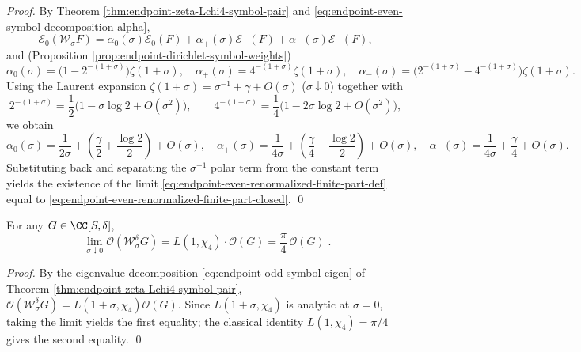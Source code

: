 \begin{proof}
By Theorem \ref{thm:endpoint-zeta-Lchi4-symbol-pair} and \eqref{eq:endpoint-even-symbol-decomposition-alpha},
\[
\mathcal E_0(\mathcal W_\sigma F)
=\alpha_0(\sigma)\mathcal E_0(F)+\alpha_+(\sigma)\mathcal E_+(F)+\alpha_-(\sigma)\mathcal E_-(F),
\]
and (Proposition \ref{prop:endpoint-dirichlet-symbol-weights})
\[
\alpha_0(\sigma)=\bigl(1-2^{-(1+\sigma)}\bigr)\zeta(1+\sigma),\quad
\alpha_+(\sigma)=4^{-(1+\sigma)}\zeta(1+\sigma),\quad
\alpha_-(\sigma)=\bigl(2^{-(1+\sigma)}-4^{-(1+\sigma)}\bigr)\zeta(1+\sigma).
\]
Using the Laurent expansion \(\zeta(1+\sigma)=\sigma^{-1}+\gamma+O(\sigma)\) (\(\sigma\downarrow 0\)) together with
\[
2^{-(1+\sigma)}=\frac12\bigl(1-\sigma\log 2+O(\sigma^2)\bigr),\qquad
4^{-(1+\sigma)}=\frac14\bigl(1-2\sigma\log 2+O(\sigma^2)\bigr),
\]
we obtain
\[
\alpha_0(\sigma)=\frac{1}{2\sigma}+\left(\frac{\gamma}{2}+\frac{\log 2}{2}\right)+O(\sigma),\quad
\alpha_+(\sigma)=\frac{1}{4\sigma}+\left(\frac{\gamma}{4}-\frac{\log 2}{2}\right)+O(\sigma),\quad
\alpha_-(\sigma)=\frac{1}{4\sigma}+\frac{\gamma}{4}+O(\sigma).
\]
Substituting back and separating the \(\sigma^{-1}\) polar term from the constant term yields the existence of the limit \eqref{eq:endpoint-even-renormalized-finite-part-def} equal to \eqref{eq:endpoint-even-renormalized-finite-part-closed}. \qed
\end{proof}

\begin{corollary}\label{cor:endpoint-odd-analytic-at-zero}
For any \(G\in\CC[S,\delta]\),
\begin{equation}\label{eq:endpoint-odd-limit-L1-chi4}
\boxed{\;
\lim_{\sigma\downarrow 0}\mathcal O(\mathcal W_{\sigma}^{\delta}G)
=L(1,\chi_{4})\cdot \mathcal O(G)
=\frac{\pi}{4}\,\mathcal O(G)\; }.
\end{equation}
\end{corollary}

\begin{proof}
By the eigenvalue decomposition \eqref{eq:endpoint-odd-symbol-eigen} of Theorem \ref{thm:endpoint-zeta-Lchi4-symbol-pair}, \(\mathcal O(\mathcal W_{\sigma}^{\delta}G)=L(1+\sigma,\chi_4)\mathcal O(G)\).
Since \(L(1+\sigma,\chi_4)\) is analytic at \(\sigma=0\), taking the limit yields the first equality; the classical identity \(L(1,\chi_4)=\pi/4\) gives the second equality. \qed
\end{proof}

